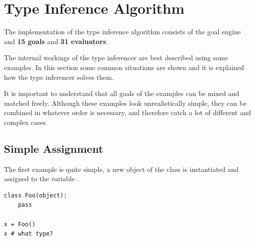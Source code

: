 \documentclass[12pt,halfparskip,DIV11,BCOR10mm]{scrreprt}
\begin{document}
\section{Type Inference Algorithm}

The implementation of the type inference algorithm consists of the goal engine and \textbf{15 goals} and \textbf{31 evaluators}.

The internal workings of the type inferencer are best described using some examples. In this section some common situations are shown and it is explained how the type inferencer solves them.

It is important to understand that all goals of the examples can be mixed and matched freely. Although these examples look unrealistically simple, they can be combined in whatever order is necessary, and therefore catch a lot of different and complex cases.


\subsection{Simple Assignment}

The first example is quite simple, a new object of the class  is instantiated and assigned to the variable . 

\begin{lstlisting}
class Foo(object):
    pass

x = Foo()
x # what type?
\end{lstlisting}
\end{document}
